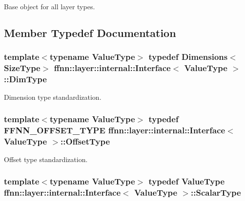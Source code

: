 Base object for all layer types. 

\subsection{Member Typedef Documentation}
\hypertarget{classffnn_1_1layer_1_1internal_1_1_interface_a8d121d0103f254b51e48f7b20a17681f}{
\subsubsection[{Dim\-Type}]{\setlength{\rightskip}{0pt plus 5cm}template$<$typename Value\-Type$>$ typedef {\bf Dimensions}$<${\bf Size\-Type}$>$ {\bf ffnn\-::layer\-::internal\-::\-Interface}$<$ Value\-Type $>$\-::{\bf Dim\-Type}}}\label{classffnn_1_1layer_1_1internal_1_1_interface_a8d121d0103f254b51e48f7b20a17681f}


Dimension type standardization. 

\hypertarget{classffnn_1_1layer_1_1internal_1_1_interface_adc5bb454329ebd51ac26579a43c006fd}{
\subsubsection[{Offset\-Type}]{\setlength{\rightskip}{0pt plus 5cm}template$<$typename Value\-Type$>$ typedef {\bf F\-F\-N\-N\-\_\-\-O\-F\-F\-S\-E\-T\-\_\-\-T\-Y\-P\-E} {\bf ffnn\-::layer\-::internal\-::\-Interface}$<$ Value\-Type $>$\-::{\bf Offset\-Type}}}\label{classffnn_1_1layer_1_1internal_1_1_interface_adc5bb454329ebd51ac26579a43c006fd}


Offset type standardization. 

\hypertarget{classffnn_1_1layer_1_1internal_1_1_interface_a7f834e3365e5199bcbcd16d9abd63941}{
\subsubsection[{Scalar\-Type}]{\setlength{\rightskip}{0pt plus 5cm}template$<$typename Value\-Type$>$ typedef Value\-Type {\bf ffnn\-::layer\-::internal\-::\-Interface}$<$ Value\-Type $>$\-::{\bf Scalar\-Type}}}\label{classffnn_1_1layer_1_1internal_1_1_interface_a7f834e3365e5199bcbcd16d9abd63941}


